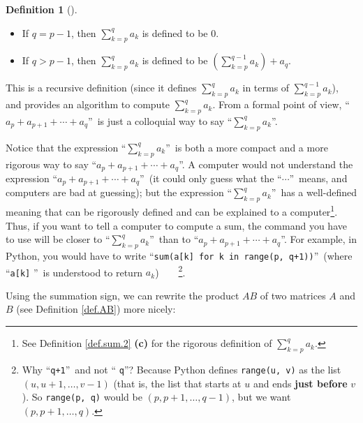 \documentclass[numbers=enddot,12pt,final,onecolumn,notitlepage]{scrartcl}%
\theoremstyle{definition}
\newtheorem{defi}[theo]{Definition}
\newenvironment{definition}[1][]
{\begin{defi}[#1]\begin{leftbar}}
{\end{leftbar}\end{defi}}
\let\sumnonlimits\sum
\renewcommand{\sum}{\sumnonlimits\limits}
\begin{document}
\begin{definition}
\begin{itemize}
\item If $q=p-1$, then $\sum_{k=p}^{q}a_{k}$ is defined to be $0$.

\item If $q>p-1$, then $\sum_{k=p}^{q}a_{k}$ is defined to be $\left(
\sum_{k=p}^{q-1}a_{k}\right)  +a_{q}$.
\end{itemize}

This is a recursive definition (since it defines $\sum_{k=p}^{q}a_{k}$ in
terms of $\sum_{k=p}^{q-1}a_{k}$), and provides an algorithm to compute
$\sum_{k=p}^{q}a_{k}$. From a formal point of view, \textquotedblleft%
$a_{p}+a_{p+1}+\cdots+a_{q}$\textquotedblright\ is just a colloquial way to
say \textquotedblleft$\sum_{k=p}^{q}a_{k}$\textquotedblright.
\end{definition}

Notice that the expression \textquotedblleft$\sum_{k=p}^{q}a_{k}%
$\textquotedblright\ is both a more compact and a more rigorous way to say
\textquotedblleft$a_{p}+a_{p+1}+\cdots+a_{q}$\textquotedblright. A computer
would not understand the expression \textquotedblleft$a_{p}+a_{p+1}%
+\cdots+a_{q}$\textquotedblright\ (it could only guess what the
\textquotedblleft$\cdots$\textquotedblright\ means, and computers are bad at
guessing); but the expression \textquotedblleft$\sum_{k=p}^{q}a_{k}%
$\textquotedblright\ has a well-defined meaning that can be rigorously defined
and can be explained to a computer\footnote{See Definition \ref{def.sum.2}
\textbf{(c)} for the rigorous definition of $\sum_{k=p}^{q}a_{k}$.}. Thus, if
you want to tell a computer to compute a sum, the command you have to use will
be closer to \textquotedblleft$\sum_{k=p}^{q}a_{k}$\textquotedblright\ than to
\textquotedblleft$a_{p}+a_{p+1}+\cdots+a_{q}$\textquotedblright. For example,
in Python, you would have to write \textquotedblleft\texttt{sum(a[k] for k in
range(p, q+1))}\textquotedblright\ (where \textquotedblleft\texttt{a[k]}%
\textquotedblright\ is understood to return $a_{k}$)\ \ \ \ \footnote{Why
\textquotedblleft\texttt{q+1}\textquotedblright\ and not \textquotedblleft%
\texttt{q}\textquotedblright? Because Python defines \texttt{range(u, v)} as
the list $\left(  u,u+1,\ldots,v-1\right)  $ (that is, the list that starts at
$u$ and ends \textbf{just before} $v$). So \texttt{range(p, q)} would be
$\left(  p,p+1,\ldots,q-1\right)  $, but we want $\left(  p,p+1,\ldots
,q\right)  $.}.

Using the summation sign, we can rewrite the product $AB$ of two matrices $A$
and $B$ (see Definition \ref{def.AB}) more nicely:
\end{document}
